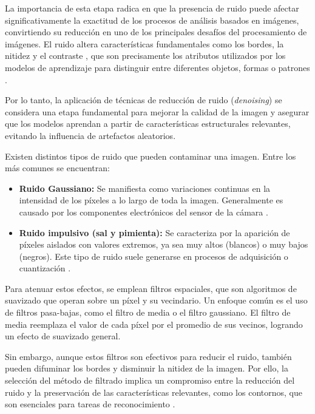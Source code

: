 	La importancia de esta etapa radica en que la presencia de ruido puede afectar significativamente la exactitud de los procesos de análisis basados en imágenes, convirtiendo su reducción en uno de los principales desafíos del procesamiento de imágenes. El ruido altera características fundamentales como los bordes, la nitidez y el contraste \cite{xian2025}, que son precisamente los atributos utilizados por los modelos de aprendizaje para distinguir entre diferentes objetos, formas o patrones \cite{betancourt2003}. 
	
	Por lo tanto, la aplicación de técnicas de reducción de ruido (\textit{denoising}) se considera una etapa fundamental para mejorar la calidad de la imagen y asegurar que los modelos aprendan a partir de características estructurales relevantes, evitando la influencia de artefactos aleatorios.
	
	Existen distintos tipos de ruido que pueden contaminar una imagen. Entre los más comunes se encuentran:
	
	\begin{itemize}
		\item \textbf{Ruido Gaussiano:} Se manifiesta como variaciones continuas en la intensidad de los píxeles a lo largo de toda la imagen. Generalmente es causado por los componentes electrónicos del sensor de la cámara \cite{mateu2017}.
		
		\item \textbf{Ruido impulsivo (sal y pimienta):} Se caracteriza por la aparición de píxeles aislados con valores extremos, ya sea muy altos (blancos) o muy bajos (negros). Este tipo de ruido suele generarse en procesos de adquisición o cuantización \cite{mateu2017}.
	\end{itemize}
	
	Para atenuar estos efectos, se emplean filtros espaciales, que son algoritmos de suavizado que operan sobre un píxel y su vecindario. Un enfoque común es el uso de filtros pasa-bajas, como el filtro de media o el filtro gaussiano. El filtro de media reemplaza el valor de cada píxel por el promedio de sus vecinos, logrando un efecto de suavizado general.
	
	Sin embargo, aunque estos filtros son efectivos para reducir el ruido, también pueden difuminar los bordes y disminuir la nitidez de la imagen. Por ello, la selección del método de filtrado implica un compromiso entre la reducción del ruido y la preservación de las características relevantes, como los contornos, que son esenciales para tareas de reconocimiento \cite{mateu2017}.
	
